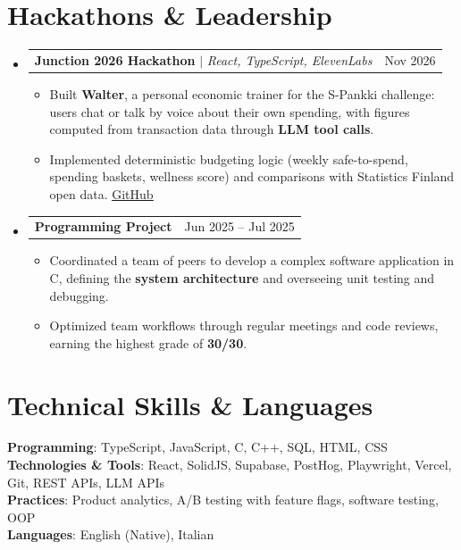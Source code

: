 \documentclass[letterpaper,11pt]{article}
\makeatletter
\newcommand{\resumeItem}[1]{\item\small{#1\vspace{-2pt}}}
\newcommand{\resumeProjectHeading}[2]{
  \item
  \begin{tabular*}{0.97\textwidth}{l@{\extracolsep{\fill}}r}
    \small#1 & #2 \\
  \end{tabular*}\vspace{-7pt}
}
\newcommand{\resumeSubHeadingListStart}{\begin{itemize}[leftmargin=0.15in,label={}]}
\newcommand{\resumeSubHeadingListEnd}{\end{itemize}}
\newcommand{\resumeItemListStart}{\begin{itemize}}
\newcommand{\resumeItemListEnd}{\end{itemize}\vspace{-5pt}}
\makeatother
\begin{document}
\section{Hackathons \& Leadership}
\resumeSubHeadingListStart
  \resumeProjectHeading
    {\textbf{Junction 2026 Hackathon} $|$ \emph{React, TypeScript, ElevenLabs}}{Nov 2026}
  \resumeItemListStart
    \resumeItem{Built \textbf{Walter}, a personal economic trainer for the S-Pankki challenge: users chat or talk by voice about their own spending, with figures computed from transaction data through \textbf{LLM tool calls}.}
    \resumeItem{Implemented deterministic budgeting logic (weekly safe-to-spend, spending baskets, wellness score) and comparisons with Statistics Finland open data. \href{https://github.com/ddavidefornelli/junction-2026}{\underline{GitHub}}}
  \resumeItemListEnd
  \resumeProjectHeading
    {\textbf{Programming Project}}{Jun 2025 -- Jul 2025}
  \resumeItemListStart
    \resumeItem{Coordinated a team of peers to develop a complex software application in C, defining the \textbf{system architecture} and overseeing unit testing and debugging.}
    \resumeItem{Optimized team workflows through regular meetings and code reviews, earning the highest grade of \textbf{30/30}.}
  \resumeItemListEnd
\resumeSubHeadingListEnd

\section{Technical Skills \& Languages}
\resumeSubHeadingListStart
  \small{\item{
    \textbf{Programming}{: TypeScript, JavaScript, C, C++, SQL, HTML, CSS} \\
    \textbf{Technologies \& Tools}{: React, SolidJS, Supabase, PostHog, Playwright, Vercel, Git, REST APIs, LLM APIs} \\
    \textbf{Practices}{: Product analytics, A/B testing with feature flags, software testing, OOP} \\
    \textbf{Languages}{: English (Native), Italian}
  }}
\resumeSubHeadingListEnd
\end{document}
